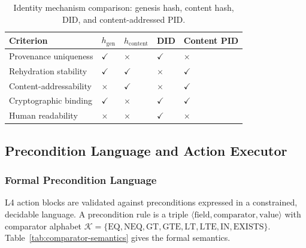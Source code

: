 \begin{table}[htbp]
\centering
\small
\caption{Identity mechanism comparison: genesis hash, content hash, DID, and content-addressed PID.}
\label{tab:identity-comparison}
\begin{tabularx}{\textwidth}{@{}p{2.5cm}p{2.5cm}p{2.5cm}p{2.5cm}X@{}}
\toprule
\textbf{Criterion} & \textbf{$h_{\text{gen}}$} & \textbf{$h_{\text{content}}$} & \textbf{DID} & \textbf{Content PID} \\
\midrule
Provenance uniqueness & $\checkmark$ & $\times$ & $\checkmark$ & $\times$ \\
Rehydration stability & $\checkmark$ & $\checkmark$ & $\times$ & $\checkmark$ \\
Content-addressability & $\times$ & $\checkmark$ & $\times$ & $\checkmark$ \\
Cryptographic binding & $\checkmark$ & $\times$ & $\checkmark$ & $\checkmark$ \\
Human readability & $\times$ & $\times$ & $\checkmark$ & $\times$ \\
\bottomrule
\end{tabularx}
\end{table}

\subsection{Precondition Language and Action Executor}\label{subsec:precondition-executor}

\subsubsection{Formal Precondition Language}\label{subsubsec:precondition-language}

L4 action blocks are validated against preconditions expressed in a constrained, decidable language. A precondition rule is a triple $\langle \text{field}, \text{comparator}, \text{value} \rangle$ with comparator alphabet $\mathcal{K} = \{\text{EQ}, \text{NEQ}, \text{GT}, \text{GTE}, \text{LT}, \text{LTE}, \text{IN}, \text{EXISTS}\}$. Table~\ref{tab:comparator-semantics} gives the formal semantics.

